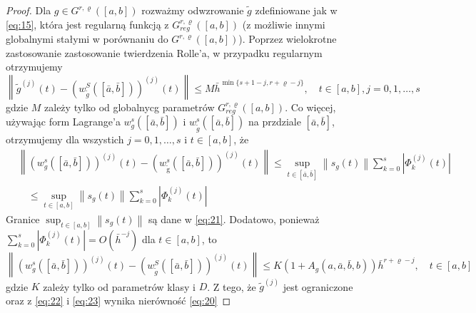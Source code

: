 \documentclass[oik, pdftex, robocza, man]{mgrwms}
\begin{document}
\begin{proof}
        Dla $g \in G^{r, \varrho}([a, b])$ rozważmy odwzrowanie $\tilde{g}$ zdefiniowane jak w \eqref{eq:15}, która jest regularną funkcją z $G_{reg}^{r, \varrho}([a, b])$ (z możliwie innymi globalnymi stałymi w porównaniu do $G^{r, \varrho}([a, b])$). Poprzez wielokrotne zastosowanie zastosowanie twierdzenia Rolle'a, w przypadku regularnym otrzymujemy
        \begin{equation} \label{eq:21}
            \left\|\tilde{g}^{(j)}(t)-\left(w_{\tilde{g}}^{S}([\bar{a}, \bar{b}])\right)^{(j)}(t)\right\| \leq M \bar{h}^{\min \{s+1-j, r+\varrho-j\}}, \quad t \in[a, b], j=0,1, \ldots, s
        \end{equation}
        gdzie $M$ zależy tylko od globalnycg parametrów $G_{reg}^{r, \varrho}([a, b])$. Co więcej, używając form Lagrange'a $w_{g}^{s}([\bar{a}, \bar{b}])$ i $w_{\tilde{g}}^{s}([\bar{a}, \bar{b}])$ na przdziale $[\bar{a}, \bar{b}]$, otrzymujemy dla wszystich $j=0,1, \ldots, s$ i $t \in[a, b]$, że
        \begin{equation*}
            \begin{aligned}
                &\left\|\left(w_{g}^{s}([\bar{a}, \bar{b}])\right)^{(j)}(t)-\left(w_{\tilde{\mathrm{g}}}^{s}([\bar{a}, \bar{b}])\right)^{(j)}(t)\right\| \leq \sup _{t \in[\bar{a}, \bar{b}]}\left\|s_{g}(t)\right\| \sum_{k=0}^{s}\left|\Phi_{k}^{(j)}(t)\right| \\
                &\quad \leq \sup _{t \in[a, b]}\left\|s_{g}(t)\right\| \sum_{k=0}^{s}\left|\Phi_{k}^{(j)}(t)\right|
                \end{aligned}
        \end{equation*}
        Granice $\sup _{t \in[a, b]}\left\|s_{g}(t)\right\|$ są dane w \eqref{eq:21}. 
        Dodatowo, ponieważ $\sum_{k=0}^{s}\left|\Phi_{k}^{(j)}(t)\right|=O\left(\bar{h}^{-j}\right)$ dla $t \in[a, b]$, to
        \begin{equation} \label{eq:23}
            \left\|\left(w_{g}^{s}([\bar{a}, \bar{b}])\right)^{(j)}(t)-\left(w_{\tilde{g}}^{S}([\bar{a}, \bar{b}])\right)^{(j)}(t)\right\| \leq K\left(1+A_{g}(a, \bar{a}, \bar{b}, b)\right) \bar{h}^{r+\varrho-j}, \quad t \in[a, b]            
        \end{equation}
        gdzie $K$ zależy tylko od parametrów klasy i $D$. Z tego, że $\tilde{g}^{(j)}$ jest ograniczone oraz z \eqref{eq:22} i \eqref{eq:23} wynika nierówność \eqref{eq:20}
    \end{proof}
\end{document}
